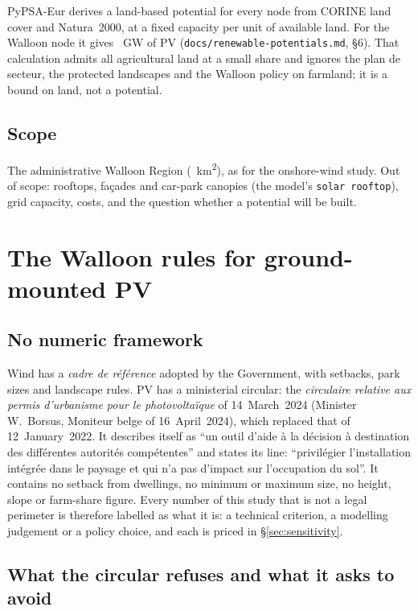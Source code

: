 \documentclass[11pt,a4paper]{article}
\begin{document}
PyPSA-Eur derives a land-based potential for every node from CORINE land cover
and Natura~2000, at a fixed capacity per unit of available land. For the
Walloon node it gives \PypsaEurGW{}~GW of PV (\texttt{docs/renewable-potentials.md},
\S{}6). That calculation admits all agricultural land at a small share and ignores
the plan de secteur, the protected landscapes and the Walloon policy on
farmland; it is a bound on land, not a potential.

\subsection{Scope}

The administrative Walloon Region (\RegionKm{}~\si{\square\kilo\metre}), as for
the onshore-wind study. Out of scope: rooftops, façades and car-park canopies
(the model's \texttt{solar rooftop}), grid capacity, costs, and the question
whether a potential will be built.

\section{The Walloon rules for ground-mounted PV}\label{sec:rules}

\subsection{No numeric framework}

Wind has a \emph{cadre de référence} adopted by the Government, with setbacks,
park sizes and landscape rules. PV has a ministerial circular: the
\emph{circulaire relative aux permis d'urbanisme pour le photovoltaïque} of
14~March~2024 (Minister W.~Borsus, Moniteur belge of 16~April~2024), which
replaced that of 12~January~2022. It describes itself as ``un outil d'aide à
la décision à destination des différentes autorités compétentes'' and states its
line: ``privilégier l'installation intégrée dans le paysage et qui n'a pas
d'impact sur l'occupation du sol''. It contains no setback from dwellings, no
minimum or maximum size, no height, slope or farm-share figure. Every number of
this study that is not a legal perimeter is therefore labelled as what it is: a
technical criterion, a modelling judgement or a policy choice, and each is
priced in \S{}\ref{sec:sensitivity}.

\subsection{What the circular refuses and what it asks to avoid}
\end{document}
